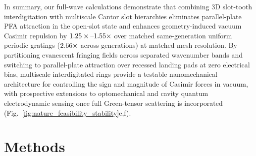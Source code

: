 \documentclass[pdflatex,sn-nature]{sn-jnl}
\begin{document}
In summary, our full-wave calculations demonstrate that combining 3D slot-tooth interdigitation with multiscale Cantor slot hierarchies eliminates parallel-plate PFA attraction in the open-slot state and enhances geometry-induced vacuum Casimir repulsion by $1.25{}\times\text{--}1.55\times$ over matched same-generation uniform periodic gratings ($2.66{}\times$ across generations) at matched mesh resolution. By partitioning evanescent fringing fields across separated wavenumber bands and switching to parallel-plate attraction over recessed landing pads at zero electrical bias, multiscale interdigitated rings provide a testable nanomechanical architecture for controlling the sign and magnitude of Casimir forces in vacuum, with prospective extensions to optomechanical and cavity quantum electrodynamic sensing once full Green-tensor scattering is incorporated (Fig.~\ref{fig:nature_feasibility_stability}e,f).

\section*{Methods}
\label{sec:methods}
\end{document}
